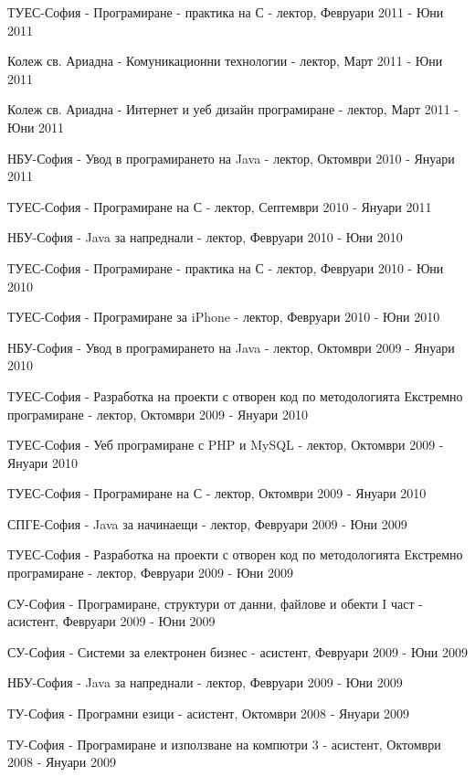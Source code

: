\documentclass[bulgarian,a4paper]{europasscv}
\begin{document}
\begin{europasscv}
{\begin{ecvitemize}
    \item ТУЕС-София - Програмиране - практика на С - лектор, Февруари 2011 - Юни 2011
    \item Колеж св. Ариадна - Комуникационни технологии - лектор, Март 2011 - Юни 2011
    \item Колеж св. Ариадна - Интернет и уеб дизайн програмиране - лектор, Март 2011 - Юни 2011
    \item НБУ-София - Увод в програмирането на Java - лектор, Октомври 2010 - Януари 2011
    \item ТУЕС-София - Програмиране на С - лектор, Септември 2010 - Януари 2011
    \item НБУ-София - Java за напреднали - лектор, Февруари 2010 - Юни 2010
    \item ТУЕС-София - Програмиране - практика на С - лектор, Февруари 2010 - Юни 2010
    \item ТУЕС-София - Програмиране за iPhone - лектор, Февруари 2010 - Юни 2010
    \item НБУ-София - Увод в програмирането на Java - лектор, Октомври 2009 - Януари 2010
    \item ТУЕС-София - Разработка на проекти с отворен код по методологията Екстремно програмиране - лектор, Октомври 2009 - Януари 2010
    \item ТУЕС-София - Уеб програмиране с PHP и MySQL - лектор, Октомври 2009 - Януари 2010
    \item ТУЕС-София - Програмиране на С - лектор, Октомври 2009 - Януари 2010
    \item СПГЕ-София - Java за начинаещи - лектор, Февруари 2009 - Юни 2009
    \item ТУЕС-София - Разработка на проекти с отворен код по методологията Екстремно програмиране - лектор, Февруари 2009 - Юни 2009
    \item СУ-София - Програмиране, структури от данни, файлове и обекти I част - асистент, Февруари 2009 - Юни 2009
    \item СУ-София - Системи за електронен бизнес - асистент, Февруари 2009 - Юни 2009
    \item НБУ-София - Java за напреднали - лектор, Февруари 2009 - Юни 2009
    \item ТУ-София - Програмни езици - асистент, Октомври 2008 - Януари 2009
    \item ТУ-София - Програмиране и използване на компютри 3 - асистент, Октомври 2008 - Януари 2009
  \end{ecvitemize}}
  
  
  \end{europasscv}


\end{document}
